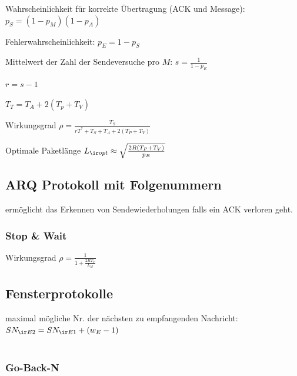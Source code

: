 \documentclass[fs, footer]{latex4ei}
\begin{document}
\begin{multicols*}{4}
Wahrscheinlichkeit für korrekte Übertragung (ACK und Message): $p_S = (1 - p_M) (1 - p_A)$

Fehlerwahrscheinlichkeit: $p_E= 1 - p_S$

Mittelwert der Zahl der Sendeversuche pro $M$: $s = \frac{1}{1 - p_E}$

$r = s - 1$

$T_T = T_A + 2 (T_p + T_V)$

Wirkungsgrad $\rho = \frac{T_S}{rT^* + T_S + T_A + 2 (T_P + T_V)}$


Optimale Paketlänge  $L_{\ir opt} \approx \sqrt{\frac{2R(T_P + T_V)}{p_B}} $

\subsection{ARQ Protokoll mit Folgenummern}

ermöglicht das Erkennen von Sendewiederholungen falls ein ACK verloren geht. 

\subsubsection{Stop \& Wait}

Wirkungsgrad $\rho = \frac{1}{1 + \frac{2 R T_P}{L_M}}$  

\subsection{Fensterprotokolle}


maximal mögliche Nr. der nächsten zu empfangenden Nachricht: \\
$SN_{\ir E2} = SN_{\ir E1} + (w_E-1)$ \\ \\ 

\subsubsection{Go-Back-N}


\end{multicols*}

\end{document}
